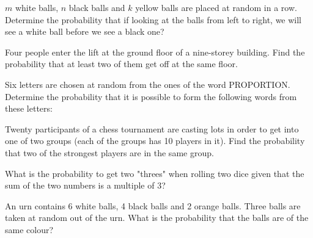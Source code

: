 \documentclass[14pt]{exam}
\begin{document}
\begin{questions}
		
		\question
		$m$ white balls, $n$ black balls and $k$ yellow balls are placed at random in a row. Determine the probability that if looking at the balls from left to right, we will see a white ball before we see a black one?






		
		\question
		Four people enter the lift at the ground floor of a nine-storey building. Find the probability that at least two of them get off at the same floor.





		
		\question
		Six letters are chosen at random from the ones of the word PROPORTION. Determine the probability that it is possible to form the following words from these letters:
		




		
		\question
		Twenty participants of a chess tournament are casting lots in order to get into one of two groups (each of the groups has 10 players in it). Find the probability that two of the strongest players are in the same group.
		





		
		
		\question
		What is the probability to get two "threes" when rolling two dice given that the sum of the two numbers is a multiple of 3?
		





		
		\question
		An urn contains 6 white balls, 4 black balls and 2 orange balls. Three balls are taken at random out of the urn. What is the probability that the balls are of the same colour?
		






\end{questions}
\end{document}
